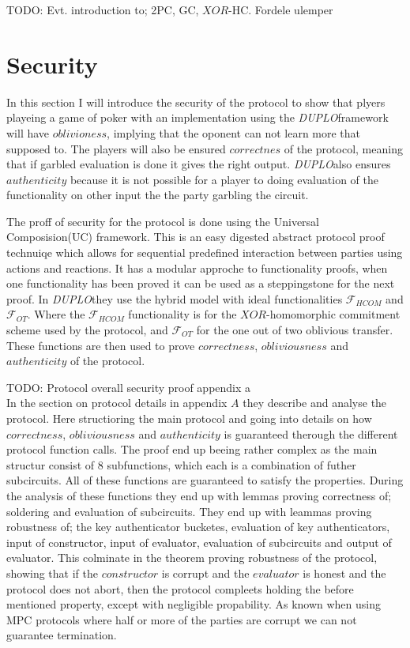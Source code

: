 \documentclass[twoside,11pt,openright]{report}
\newcommand{\todo}[1]{}
\renewcommand{\todo}[1]{{\color{red} TODO: {#1}} \\}
\newcommand{\DUPLO}{\textit{DUPLO}}
\begin{document}
\todo{Evt. introduction to; 2PC, GC, $XOR$-HC. Fordele ulemper}

\section{Security}
\label{sec:duplo_secutity}
In this section I will introduce the security of the protocol to show that plyers playeing a game of poker with an implementation using the \DUPLO framework will have $oblivioness$, implying that the oponent can not learn more that supposed to. The players will also be ensured $correctnes$ of the protocol, meaning that if garbled evaluation is done it gives the right output. \DUPLO also ensures $authenticity$ because it is not possible for a player to doing evaluation of the functionality on other input the the party garbling the circuit.

\bigskip

The proff of security for the protocol is done using the Universal Composision(UC) framework. This is an easy digested abstract protocol proof technuiqe which allows for sequential predefined interaction between parties using actions and reactions. It has a modular approche to functionality proofs, when one functionality has been proved it can be used as a steppingstone for the next proof. In \DUPLO they use the hybrid model with ideal functionalities $\mathcal{F}_{HCOM}$ and $\mathcal{F}_{OT}$. Where the $\mathcal{F}_{HCOM}$ functionality is for the $XOR$-homomorphic commitment scheme used by the protocol, and $\mathcal{F}_{OT}$ for the one out of two oblivious transfer. These functions are then used to prove $correctness$, $obliviousness$ and $authenticity$ of the protocol. 

\todo{Protocol overall security proof appendix a}
In the section on protocol details in  appendix $A$ they describe and analyse the protocol. Here structioring the main protocol and going into details on how $correctness$, $obliviousness$ and $authenticity$ is guaranteed therough the different protocol function calls. The proof end up beeing rather complex as the main structur consist of $8$ subfunctions, which each is a combination of futher subcircuits. All of these functions are guaranteed to satisfy the properties. During the analysis of these functions they end up with lemmas proving correctness of; soldering and evaluation of subcircuits. They end up with leammas proving robustness of; the key authenticator bucketes, evaluation of key authenticators, input of constructor, input of evaluator, evaluation of subcircuits and output of evaluator. This colminate in the theorem proving robustness of the protocol, showing that if the $constructor$ is corrupt and the $evaluator$ is honest and the protocol does not abort, then the protocol compleets holding the before mentioned property, except with negligible propability. As known when using MPC protocols where half or more of the parties are corrupt we can not guarantee termination.
\end{document}
